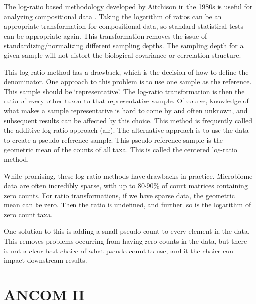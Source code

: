 \documentclass[
]{book}
\begin{document}
The log-ratio based methodology developed by Aitchison in the 1980s is useful for analyzing compositional data \citep{aitchison1982}. Taking the logarithm of ratios can be an appropriate transformation for compositional data, so standard statistical tests can be appropriate again. This transformation removes the issue of standardizing/normalizing different sampling depths. The sampling depth for a given sample will not distort the biological covariance or correlation structure.

This log-ratio method has a drawback, which is the decision of how to define the denominator. One approach to this problem is to use one sample as the reference. This sample should be `representative'. The log-ratio transformation is then the ratio of every other taxon to that representative sample. Of course, knowledge of what makes a sample representative is hard to come by and often unknown, and subsequent results can be affected by this choice. This method is frequently called the additive log-ratio approach (alr). The alternative approach is to use the data to create a pseudo-reference sample. This pseudo-reference sample is the geometric mean of the counts of all taxa. This is called the centered log-ratio method.

While promising, these log-ratio methods have drawbacks in practice. Microbiome data are often incredibly sparse, with up to 80-90\% of count matrices containing zero counts. For ratio transformations, if we have sparse data, the geometric mean can be zero. Then the ratio is undefined, and further, so is the logarithm of zero count taxa.

One solution to this is adding a small pseudo count to every element in the data. This removes problems occurring from having zero counts in the data, but there is not a clear best choice of what pseudo count to use, and it the choice can impact downstream results.

\hypertarget{ancom-ii}{%
\section{ANCOM II}\label{ancom-ii}}
\end{document}
